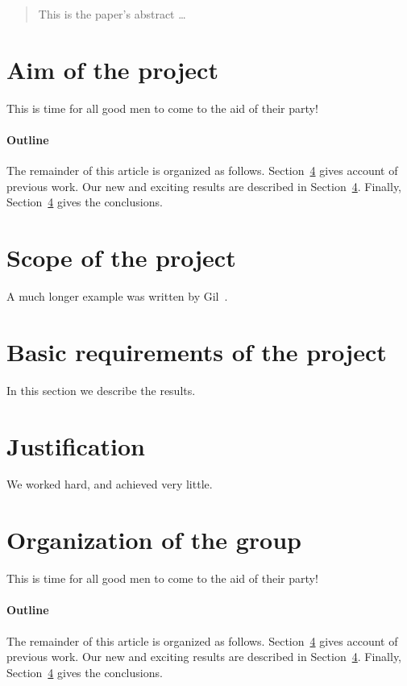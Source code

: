 \documentclass[12pt, titlepage]{article}
\begin{document}
\maketitle

\pagebreak
\begin{abstract}
This is the paper's abstract \ldots
\end{abstract}
\pagebreak


\section{Aim of the project}
This is time for all good men to come to the aid of their party!

\paragraph{Outline}
The remainder of this article is organized as follows.
Section~\ref{justification} gives account of previous work.
Our new and exciting results are described in Section~\ref{justification}.
Finally, Section~\ref{justification} gives the conclusions.

\section{Scope of the project}
A much longer \LaTeXe{} example was written by Gil~\cite{Gil:02}.

\section{Basic requirements of the project}
In this section we describe the results.

\section{Justification } \label{justification}
We worked hard, and achieved very little.

\section{Organization of the group}
This is time for all good men to come to the aid of their party!

\paragraph{Outline}
The remainder of this article is organized as follows.
Section~\ref{justification} gives account of previous work.
Our new and exciting results are described in Section~\ref{justification}.
Finally, Section~\ref{justification} gives the conclusions.
\end{document}
